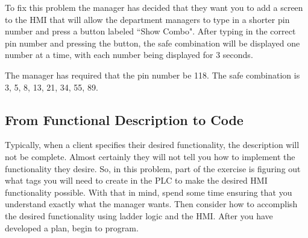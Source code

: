 To fix this problem the manager has decided that they want you to add a screen to the HMI that will allow the department managers to type in a shorter pin number and press a button labeled ``Show Combo". After typing in the correct pin number and pressing the button, the safe combination will be displayed one number at a time, with each number being displayed for 3 seconds.

The manager has required that the pin number be 118. The safe combination is 3, 5, 8, 13, 21, 34, 55, 89. 



\subsection{From Functional Description to Code}

Typically, when a client specifies their desired functionality, the description will not be complete. Almost certainly they will not tell you how to implement the functionality they desire. So, in this problem, part of the exercise is figuring out what tags you will need to create in the PLC to make the desired HMI functionality possible. With that in mind, spend some time ensuring that you understand exactly what the manager wants. Then consider how to accomplish the desired functionality using ladder logic and the HMI. After you have developed a plan, begin to program.

\TASignatureSlot